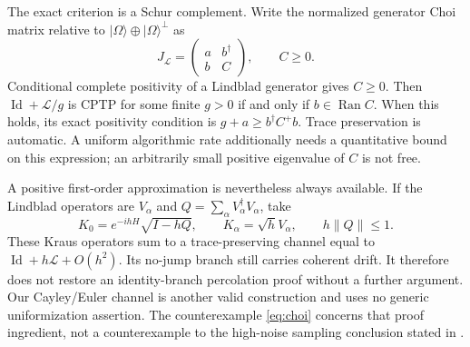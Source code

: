 \documentclass[11pt,reqno]{amsart}
\numberwithin{equation}{section}
\theoremstyle{definition}
\theoremstyle{remark}
\newcommand{\Id}{\operatorname{Id}}
\newcommand{\nn}[1]{\lVert#1\rVert}
\newcommand{\ket}[1]{\lvert#1\rangle}
\newcommand{\cL}{\mathcal L}
\begin{document}
The exact criterion is a Schur complement. Write the normalized generator Choi matrix relative to $\ket\Omega\oplus\ket\Omega^\perp$ as
\[
 J_{\cL}=\begin{pmatrix}a&b^\dagger\\b&C\end{pmatrix},\qquad C\geq0.
\]
Conditional complete positivity of a Lindblad generator gives $C\geq0$. Then $\Id+\cL/g$ is CPTP for some finite $g>0$ if and only if $b\in\operatorname{Ran}C$. When this holds, its exact positivity condition is
$g+a\geq b^\dagger C^+b$. Trace preservation is automatic. A uniform algorithmic rate additionally needs a quantitative bound on this expression; an arbitrarily small positive eigenvalue of $C$ is not free.

A positive first-order approximation is nevertheless always available. If the Lindblad operators are $V_\alpha$ and $Q=\sum_\alpha V_\alpha^\dagger V_\alpha$, take
\[
 K_0=e^{-ihH}\sqrt{I-hQ},\qquad K_\alpha=\sqrt h V_\alpha,
 \qquad h\nn Q\leq1.
\]
These Kraus operators sum to a trace-preserving channel equal to $\Id+h\cL+O(h^2)$. Its no-jump branch still carries coherent drift. It therefore does not restore an identity-branch percolation proof without a further argument. Our Cayley/Euler channel is another valid construction and uses no generic uniformization assertion. The counterexample \eqref{eq:choi} concerns that proof ingredient, not a counterexample to the high-noise sampling conclusion stated in \cite{TC}.

\end{document}
